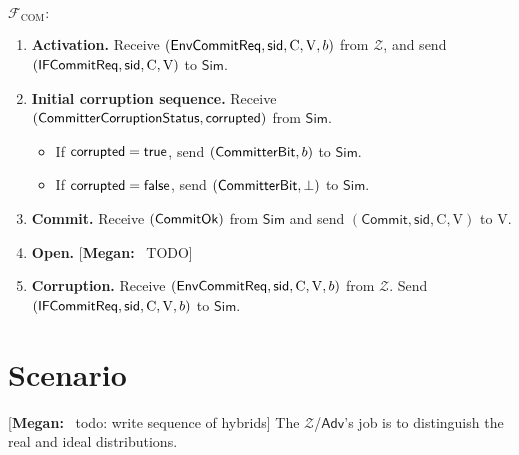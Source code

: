 \documentclass[11pt,letterpaper]{article}
\newcommand{\doclearpage}{%
  \iffull\clearpage\else\fi
}
\newcommand{\authnote}[2]{[{\color{red}\textbf{#1:}}~{\color{blue} #2}]}
\newcommand{\authnote}[2]{}
\newcommand{\megan}[1]{\authnote{Megan}{#1}}
\theoremstyle{plain} %
\theoremstyle{definition} %
\theoremstyle{remark} %
\newcommand{\CommitMsg}{\mathsf{Commit}}
\newcommand{\Simulator}{{\mathsf{Sim}}} %
\newcommand{\Adversary}{{\mathsf{Adv}}} %
\newcommand{\Environment}{{\mathcal{Z}}} %
\newcommand{\IF}{\mathcal{F}} %
\newcommand{\sid}{\mathsf{sid}}
\newcommand{\True}{\mathsf{true}}
\newcommand{\False}{\mathsf{false}}
\newcommand{\IFCom}{\IF_{\mathrm{COM}}}
\newcommand{\PartyCommitter}{\mathrm{C}}
\newcommand{\PartyVerifier}{\mathrm{V}}
\newcommand{\CommittedBit}{b}
\begin{document}
\begin{center}
\begin{minipage}{0.9\textwidth}
$\IFCom:$
\begin{enumerate}
	\item \textbf{Activation.} Receive $(\EnvCommitReqMsg, \sid, \PartyCommitter, \PartyVerifier, \CommittedBit)$ from $\Environment$, and send $(\IFCommitReqMsg, \sid, \PartyCommitter,\PartyVerifier)$ to $\Simulator$.

	\item \textbf{Initial corruption sequence.} Receive $(\mathsf{CommitterCorruptionStatus}, \mathsf{corrupted})$ from $\Simulator$.
	\begin{itemize}
		\item If $\CommitterCorruptedBit = \True$, send $(\CommitterBitMsg, \CommittedBit)$ to $\Simulator$.
		\item If $\CommitterCorruptedBit = \False$, send $(\mathsf{CommitterBit}, \bot)$ to $\Simulator$.
	\end{itemize}

	\item \textbf{Commit.} Receive $(\mathsf{CommitOk})$ from $\Simulator$ and send $(\CommitMsg, \sid, \PartyCommitter, \PartyVerifier)$ to $\PartyVerifier$.

	\item \textbf{Open.} \megan{TODO}

	\item \textbf{Corruption.} Receive $(\EnvCommitReqMsg, \sid, \PartyCommitter, \PartyVerifier, \CommittedBit)$ from $\Environment$. Send $(\IFCommitReqMsg, \sid, \PartyCommitter,\PartyVerifier, \CommittedBit)$ to $\Simulator$.
\end{enumerate}
\end{minipage}
\end{center}

\doclearpage
\section{Scenario}
\label{sec:scenario}

\megan{todo: write sequence of hybrids}
The $\Environment$/$\Adversary$'s job is to distinguish the real and ideal distributions.
\end{document}
